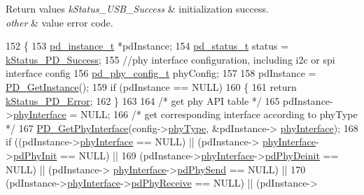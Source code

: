 \begin{DoxyRetVals}{Return values}
{\em k\-Status\-\_\-\-U\-S\-B\-\_\-\-Success} & initialization success. \\
\hline
{\em other} & value error code. \\
\hline
\end{DoxyRetVals}

\begin{DoxyCode}
152 \{
153     \hyperlink{struct__pd__instance}{pd\_instance\_t} *pdInstance;
154     \hyperlink{group__usb__pd__stack_ga04a1f331d9807a70ab9bb753f5ed1c80}{pd\_status\_t} status = \hyperlink{group__usb__pd__stack_ggaaad4cd00dd02567c6169429e3a895073acf06f954f9c52f560cea34df48c63555}{kStatus\_PD\_Success};
155     \textcolor{comment}{//phy interface configuration, including i2c or spi interface config}
156     \hyperlink{struct__pd__phy__config}{pd\_phy\_config\_t} phyConfig;
157 
158     pdInstance = \hyperlink{usb__pd__interface_8c_aabf54379477268c9186bc3cbc84f29e2}{PD\_GetInstance}();
159     \textcolor{keywordflow}{if} (pdInstance == NULL)
160     \{
161         \textcolor{keywordflow}{return} \hyperlink{group__usb__pd__stack_ggaaad4cd00dd02567c6169429e3a895073a4d58370b8ee8d3d2a4c477f7a3f84dda}{kStatus\_PD\_Error};
162     \}
163 
164     \textcolor{comment}{/* get phy API table */}
165     pdInstance->\hyperlink{struct__pd__instance_adbed7b2cd53df40e0611a8879c903339}{phyInterface} = NULL;
166     \textcolor{comment}{/* get corresponding interface according to phyType */}
167     \hyperlink{usb__pd__interface_8c_a33e4ca77d64aa73779c39be033ec640b}{PD\_GetPhyInterface}(config->\hyperlink{struct__pd__instance__config_a1f5e597bbfc0af871a5e887c34eb3aca}{phyType}, &pdInstance->
      \hyperlink{struct__pd__instance_adbed7b2cd53df40e0611a8879c903339}{phyInterface});
168     \textcolor{keywordflow}{if} ((pdInstance->\hyperlink{struct__pd__instance_adbed7b2cd53df40e0611a8879c903339}{phyInterface} == NULL) || (pdInstance->
      \hyperlink{struct__pd__instance_adbed7b2cd53df40e0611a8879c903339}{phyInterface}->\hyperlink{struct__pd__phy__api__interface_a8f9666a7543d431aec266710dbc8d78c}{pdPhyInit} == NULL) ||
169         (pdInstance->\hyperlink{struct__pd__instance_adbed7b2cd53df40e0611a8879c903339}{phyInterface}->\hyperlink{struct__pd__phy__api__interface_a9e36ebe547c2ed82866597b2afc54bd0}{pdPhyDeinit} == NULL) || (pdInstance->
      \hyperlink{struct__pd__instance_adbed7b2cd53df40e0611a8879c903339}{phyInterface}->\hyperlink{struct__pd__phy__api__interface_ab9b74f09035836be811dc6aae682074f}{pdPhySend} == NULL) ||
170         (pdInstance->\hyperlink{struct__pd__instance_adbed7b2cd53df40e0611a8879c903339}{phyInterface}->\hyperlink{struct__pd__phy__api__interface_a3c8508914afbcb4f55578a0d61cd90e3}{pdPhyReceive} == NULL) || (pdInstance->

\end{DoxyCode}
